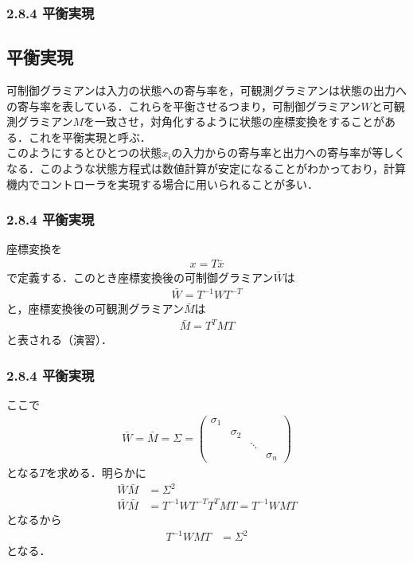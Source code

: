 \begin{frame}[t]
\frametitle{2.8.4 平衡実現}



\subsection{平衡実現}

可制御グラミアンは入力の状態への寄与率を，可観測グラミアンは状態の出力への寄与率を表している．これらを平衡させるつまり，可制御グラミアン$W$と可観測グラミアン$M$を一致させ，対角化するように状態の座標変換をすることがある．これを平衡実現と呼ぶ．
\\[3mm]

このようにするとひとつの状態$x_i$の入力からの寄与率と出力への寄与率が等しくなる．このような状態方程式は数値計算が安定になることがわかっており，計算機内でコントローラを実現する場合に用いられることが多い．

\end{frame}

\begin{frame}[t]
\frametitle{2.8.4 平衡実現}

座標変換を
\begin{align}
	x=T\bar{x}
\end{align}で定義する．このとき座標変換後の可制御グラミアン$\bar{W}$は
\begin{align}
	\bar{W}= T^{-1} W T^{-T}
\end{align}
と，座標変換後の可観測グラミアン$\bar{M}$は
\begin{align}
	\bar{M}= T^T M T
\end{align}
と表される（演習）．
\end{frame}

\begin{frame}[t]
\frametitle{2.8.4 平衡実現}
ここで
\begin{align}
	\bar{W}=\bar{M}= \Sigma 
	= 
	\left(\begin{array}{cccc}
         \sigma_1 &          &       &  \\
                  & \sigma_2 &       &  \\
                  &          & \ddots &  \\
                  &          &       &  \sigma_n
	\end{array}\right)
\end{align}
となる$T$を求める．明らかに
\begin{align}
	\bar{W} \bar{M} &= \Sigma^2
\\
	\bar{W} \bar{M} &= T^{-1} W T^{-T} T^T M T = T^{-1} W M T
\end{align}
となるから
\begin{align}
	T^{-1} W M T &= \Sigma^2
\end{align}
となる．
\end{frame}

